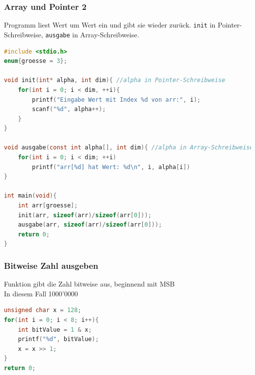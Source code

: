 		\subsubsection{Array und Pointer 2}
			Programm liest Wert um Wert ein und gibt sie wieder zurück. \verb|init| in Pointer-Schreibweise, \verb|ausgabe| in Array-Schreibweise.
			\begin{lstlisting}[language=C]
#include <stdio.h>
enum{groesse = 3};

void init(int* alpha, int dim){ //alpha in Pointer-Schreibweise
	for(int i = 0; i < dim, ++i){
		printf("Eingabe Wert mit Index %d von arr:", i);
		scanf("%d", alpha++);
	}
}

void ausgabe(const int alpha[], int dim){ //alpha in Array-Schreibweise
	for(int i = 0; i < dim; ++i)
		printf("arr[%d] hat Wert: %d\n", i, alpha[i])
}

int main(void){
	int arr[groesse];
	init(arr, sizeof(arr)/sizeof(arr[0]));
	ausgabe(arr, sizeof(arr)/sizeof(arr[0]));
	return 0;
}
			\end{lstlisting}

		\subsubsection{Bitweise Zahl ausgeben}
			Funktion gibt die Zahl bitweise aus, beginnend mit MSB\\
			In diesem Fall 1000'0000
			\begin{lstlisting}[language=C]
unsigned char x = 128;
for(int i = 0; i < 8; i++){
	int bitValue = 1 & x;
	printf("%d", bitValue);
	x = x >> 1;
}
return 0;
			\end{lstlisting}